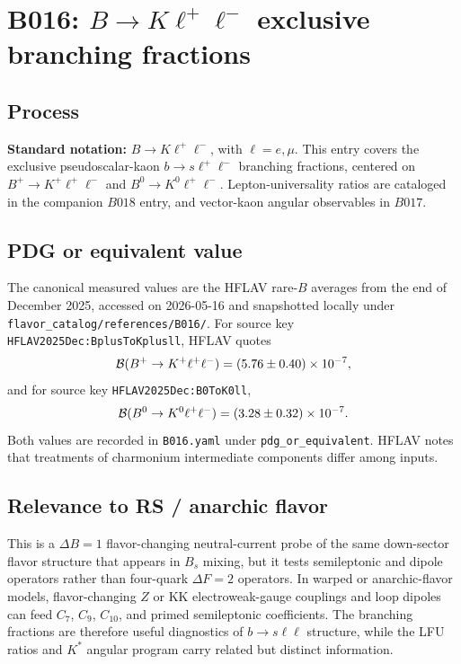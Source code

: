 
\section{B016: \(B\to K\ell^+\ell^-\) exclusive branching fractions}

\subsection*{Process}
\textbf{Standard notation:} \(B\to K\ell^+\ell^-\), with \(\ell=e,\mu\).
This entry covers the exclusive pseudoscalar-kaon \(b\to s\ell^+\ell^-\)
branching fractions, centered on \(B^+\to K^+\ell^+\ell^-\) and
\(B^0\to K^0\ell^+\ell^-\).  Lepton-universality ratios are cataloged in
the companion \(B018\) entry, and vector-kaon angular observables in \(B017\).

\subsection*{PDG or equivalent value}
The canonical measured values are the HFLAV rare-\(B\) averages from the end
of December 2025, accessed on 2026-05-16 and snapshotted locally under
\texttt{flavor\_catalog/references/B016/}.  For source key
\texttt{HFLAV2025Dec:BplusToKplusll}, HFLAV quotes
\[
  {\cal B}(B^+\to K^+\ell^+\ell^-)
  =(5.76\pm0.40)\times10^{-7},
\]
and for source key \texttt{HFLAV2025Dec:B0ToK0ll},
\[
  {\cal B}(B^0\to K^0\ell^+\ell^-)
  =(3.28\pm0.32)\times10^{-7}.
\]
Both values are recorded in \texttt{B016.yaml} under
\texttt{pdg\_or\_equivalent}.  HFLAV notes that treatments of charmonium
intermediate components differ among inputs.

\subsection*{Relevance to RS / anarchic flavor}
This is a \(\Delta B=1\) flavor-changing neutral-current probe of the same
down-sector flavor structure that appears in \(B_s\) mixing, but it tests
semileptonic and dipole operators rather than four-quark \(\Delta F=2\)
operators.  In warped or anarchic-flavor models, flavor-changing \(Z\) or KK
electroweak-gauge couplings and loop dipoles can feed \(C_7\), \(C_9\),
\(C_{10}\), and primed semileptonic coefficients.  The branching fractions are
therefore useful diagnostics of \(b\to s\ell\ell\) structure, while the LFU
ratios and \(K^*\) angular program carry related but distinct information.

